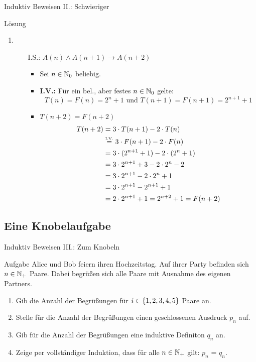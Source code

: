 \begin{frame}{Induktiv Beweisen II.: Schwieriger}
	\begin{block}{Lösung}
	\begin{enumerate}
		\setcounter{enumi}{\value{kevin}}
		\item
		\begin{itemize}
				\item[I.S.:] $A(n) \wedge A(n+1) \rightarrow A(n+2)$ %
					\begin{itemize}
						\item Sei $n \in \mathbb{N}_{0}$ beliebig.
						\item \textbf{I.V.:} Für ein bel., aber festes $n \in \mathbb{N}_0$ gelte:
				 					\[T(n)=F(n)=2^n+1 \text{ und } T(n+1)=F(n+1)=2^{n+1}+1\]
				 		\item \zz $T(n+2) = F(n+2)$
				 		\begin{align*}
							T(n+2) &= 3 \cdot T(n+1) - 2 \cdot T(n) \\
								   &\eqtext{I.V.} 3 \cdot F(n+1) - 2 \cdot F(n) \\
								   &= 3 \cdot (2^{n+1}+1) - 2 \cdot (2^n+1) \\
								   &= 3 \cdot 2^{n+1} + 3 - 2 \cdot 2^n - 2 \\
								   &= 3 \cdot 2^{n+1} - 2 \cdot 2^n + 1 \\
								   &= 3 \cdot 2^{n+1} - 2^{n+1} +1 \\
								   &= 2 \cdot 2^{n+1} + 1 = 2^{n+2} + 1 = F(n+2)
						\end{align*}
					\end{itemize}				
			\end{itemize}
		\end{enumerate}
	\end{block}
\end{frame}
\subsection{Eine Knobelaufgabe}
\begin{frame}{Induktiv Beweisen III.: Zum Knobeln}
	\begin{exampleblock}{Aufgabe}
		Alice und Bob feiern ihren Hochzeitstag. Auf ihrer Party befinden sich $n \in \mathbb{N}_+$ Paare. Dabei begrüßen sich alle Paare mit Ausnahme des eigenen Partners.\\
		\begin{enumerate}
			\item Gib die Anzahl der Begrüßungen für $i \in \left\{ 1,2,3,4,5 \right\}$ Paare an.
			\item Stelle für die Anzahl der Begrüßungen einen geschlossenen Ausdruck $p_n$ auf.
			\item Gib für die Anzahl der Begrüßungen eine induktive Definiton $q_n$ an.
			\item Zeige per vollständiger Induktion, dass für alle $n \in \mathbb{N}_+$ gilt: $p_n$ = $q_n$.
		\end{enumerate}
	\end{exampleblock}
\end{frame}

